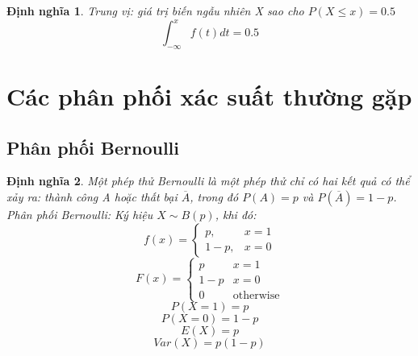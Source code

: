 \documentclass[12pt]{article}
\def\bar#1{\overline{#1}}
\newtheorem{thm}{Định nghĩa}
\begin{document}
\begin{thm}
    Trung vị: giá trị biến ngẫu nhiên X sao cho $P(X \leq x) = 0.5$
    \begin{equation}
    \int_{-\infty}^x f(t)dt = 0.5
    \end{equation}
\end{thm}

\section{Các phân phối xác suất thường gặp}
\subsection{Phân phối Bernoulli}
\begin{thm}
    Một phép thử Bernoulli là một phép thử chỉ có hai kết quả có thể xảy ra: thành công A hoặc thất bại $\bar{A}$, trong đó $P(A) = p$ và $P(\bar{A}) = 1 - p$.
    Phân phối Bernoulli: Ký hiệu $X \sim B(p)$, khi đó:
    \begin{equation}
    f(x) = \begin{cases}
    p, & x = 1 \\
    1 - p, & x = 0
    \end{cases}
    \end{equation}
    \begin{equation}
    F(x) = \begin{cases}
        p & x = 1 \\
        1 - p & x = 0 \\
        0 & \text{otherwise}
    \end{cases}
    \end{equation}
    \begin{equation}
    P(X = 1) = p
    \end{equation}
    \begin {equation}
    P(X = 0) = 1 - p
    \end{equation}
    \begin{equation}
    E(X) = p
    \end{equation}
    \begin{equation}
    Var(X) = p(1 - p)
    \end{equation}
\end{thm}
\end{document}

